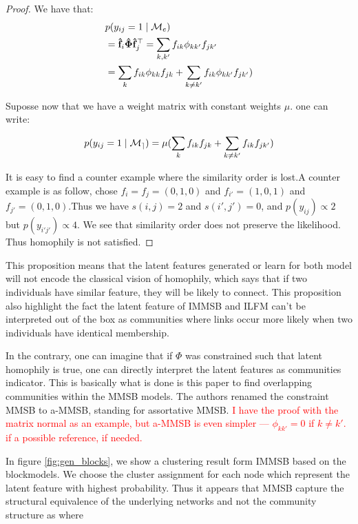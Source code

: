 \begin{proof}
We have that:
\begin{align}
&p(y_{ij}=1 \mid \mathcal{M}_e) \nonumber \\
&=  \mathbf{\hat{f}}_{i} \mathbf{\hat{\Phi}} \mathbf{\hat{f}}_j^\top \nonumber = \sum_{k,k'} f_{ik}\phi_{kk'}f_{jk'}   \nonumber \\
&= \sum_k f_{ik}\phi_{kk}f_{jk} + \sum_{k\neq k'} f_{ik}\phi_{kk'}f_{jk'} ) \nonumber
\end{align}

 Suposse now that we have a weight matrix with constant weights $\mu$. one can write:

\begin{equation}
p(y_{ij}=1 \mid \mathcal{M_e})= \mu (\sum_k f_{ik}f_{jk} + \sum_{k\neq k'} f_{ik}f_{jk'} ) \nonumber
\end{equation}

It is easy to find a counter example where the similarity order is lost.A counter example is as follow, chose $f_i=f_j=(0,1,0)$ and $f_{i'}=(1,0,1)$ and $f_{j'}=(0,1,0)$.Thus we have $s(i,j)=2$ and $s(i',j')=0$, and $p(y_{ij}) \propto 2$ but $p(y_{i'j'}) \propto 4$. We see that similarity order does not preserve the likelihood. Thus homophily is not satisfied. 
\end{proof} 



This proposition means that the latent features generated or learn for both model will not encode the classical vision of homophily, which says that if two individuals have similar feature, they will be likely to connect. This proposition also highlight the fact the latent feature of IMMSB and ILFM can't be interpreted out of the box as communities where links occur more likely when two individuals have identical membership.

In the contrary, one can imagine that if $\Phi$ was constrained such that latent homophily is true, one can directly interpret the latent features as communities indicator. This is basically what is done is this paper \cite{AMMSB} to find overlapping communities within the MMSB models. The authors renamed the constraint MMSB to a-MMSB, standing for assortative MMSB. \textcolor{red}{I have the proof with the matrix normal as an example, but a-MMSB is even simpler --- $\phi_{kk'}=0$ if $k\neq k'$. if a possible reference, if needed.}

In figure \ref{fig:gen_blocks}, we show a clustering result form IMMSB based on the blockmodels. We choose the cluster assignment for each node which represent the latent feature with highest probability. Thus it appears that MMSB capture the structural equivalence of the underlying networks and not the community structure as where

